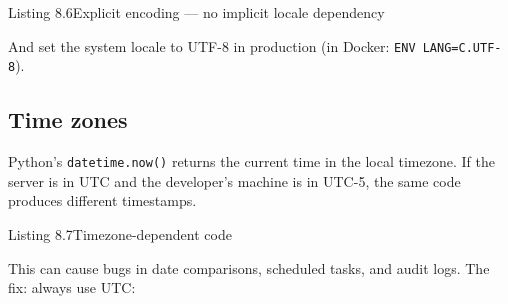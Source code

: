 \begin{codeboxcap}[short]{\textcolor{accent}{Listing 8.6}\enspace Explicit encoding --- no implicit locale dependency}

\begin{Shaded}
\begin{Highlighting}[]
 \NormalTok{(}\NormalTok{, }\OperatorTok{=}\NormalTok{) }
\NormalTok{)}
\end{Highlighting}
\end{Shaded}

\end{codeboxcap}

\noindent{}And set the system locale to UTF-8 in production (in Docker: \texttt{ENV\ LANG=C.UTF-8}).

\subsection*{Time zones}\label{08-hidden-dependencies:time-zones}

Python's \texttt{datetime.now()} returns the current time in the local timezone. If the server is in UTC and the developer's machine is in UTC-5, the same code produces different timestamps.

\begin{codeboxcap}[short]{\textcolor{accent}{Listing 8.7}\enspace Timezone-dependent code}

\begin{Shaded}
\begin{Highlighting}[]

\OperatorTok{=}
\end{Highlighting}
\end{Shaded}

\end{codeboxcap}

\noindent{}This can cause bugs in date comparisons, scheduled tasks, and audit logs. The fix: always use UTC:

